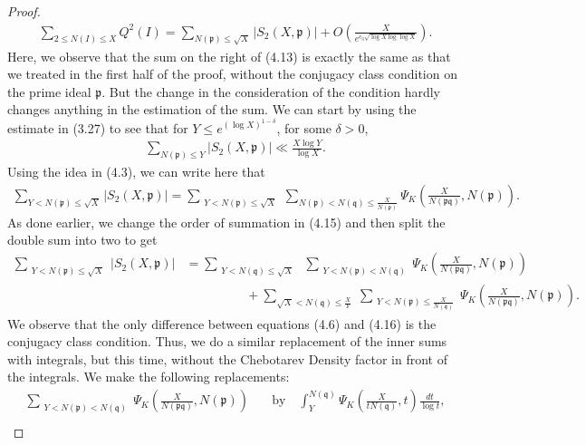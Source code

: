 \documentclass[10pt,a4paper]{amsart}
\begin{document}
\begin{proof}
\begin{align}
    \sum_{2\leq N(I)\leq X} Q^2(I) = \sum_{N(\mathfrak{p})\leq \sqrt{X} } |S_2(X,\mathfrak{p})| +  O\left(\frac{X}{e^{c_3\sqrt{\log X\log\log X}}}\right).
\end{align}
Here, we observe that the sum on the right of (4.13) is exactly the same as that we treated in the first half of the proof, without the conjugacy class condition on the prime ideal $\mathfrak{p}$. But the change in the consideration of the condition hardly changes anything in the estimation of the sum. We can start by using the estimate in (3.27) to see that for $Y\leq e^{(\log X)^{1-\delta}}$, for some $\delta>0$, 
\begin{align}
    \sum_{N(\mathfrak{p})\leq Y} |S_2(X,\mathfrak{p})| \ll\frac{X\log Y}{\log X}.
\end{align}
Using the idea in (4.3), we can write here that
\begin{align}
    \sum_{Y<N(\mathfrak{p}) \leq \sqrt{X}} |S_2(X,\mathfrak{p})| = \sum_{\substack{Y<N(\mathfrak{p}) \leq \sqrt{X} }} \sum_{N(\mathfrak{p})<N(\mathfrak{q})\leq \frac{X}{N(\mathfrak{p})}} \Psi_K\left(\frac{X}{N(\mathfrak{p}\mathfrak{q})},N(\mathfrak{p})\right) .
\end{align}
As done earlier, we change the order of summation in (4.15) and then split the double sum into two to get
\begin{align}
    \sum_{\substack{Y<N(\mathfrak{p}) \leq \sqrt{X} }} |S_2(X,\mathfrak{p})| &= \sum_{\substack{Y <N(\mathfrak{q}) \leq \sqrt{X}}} \;  \sum_{\substack{Y<N(\mathfrak{p})<N(\mathfrak{q}) }} \Psi_K\left(\frac{X}{N(\mathfrak{p}\mathfrak{q})},N(\mathfrak{p})\right) \nonumber \\ &\hspace{2cm}+ \sum_{\sqrt{X} < N(\mathfrak{q}) \leq \frac{X}{Y}} \;\sum_{\substack{Y<N(\mathfrak{p})\leq \frac{X}{N(\mathfrak{q})}} } \Psi_K\left(\frac{X}{N(\mathfrak{p}\mathfrak{q})},N(\mathfrak{p})\right) .
\end{align}
We observe that the only difference between equations (4.6) and (4.16) is the conjugacy class condition. Thus, we do a similar replacement of the inner sums with integrals, but this time, without the Chebotarev Density factor in front of the integrals. We make the following replacements:
\begin{align}
    \sum_{\substack{Y<N(\mathfrak{p})<N(\mathfrak{q}) }} \Psi_K\left(\frac{X}{N(\mathfrak{p}\mathfrak{q})},N(\mathfrak{p})\right) \quad &\text{by} \quad \int_Y^{N(\mathfrak{q})} \Psi_K\left(\frac{X}{tN(\mathfrak{q})},t\right)\frac{dt}{\log t}, \nonumber \\

\end{align}
\end{proof}
\end{document}
